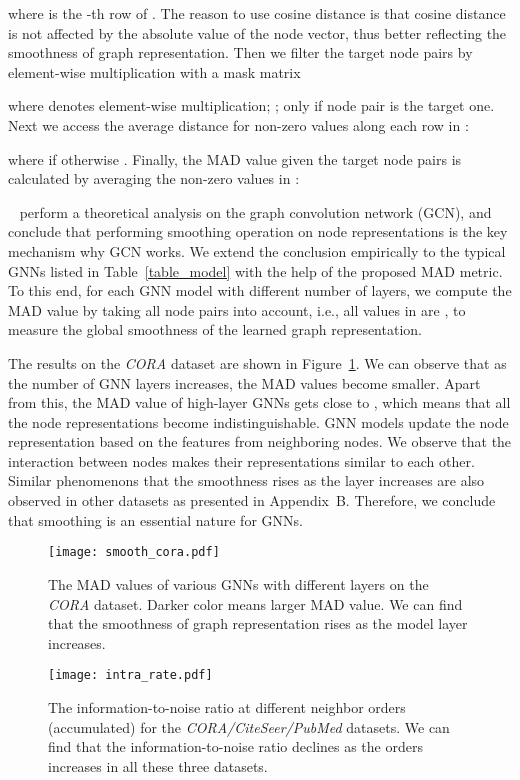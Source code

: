 \documentclass[letterpaper]{article} \usepackage{aaai20}  \usepackage{times}  \usepackage{helvet} \usepackage{courier}  \usepackage[hyphens]{url}  \usepackage{graphicx} \urlstyle{rm} \def\UrlFont{\rm}  \frenchspacing  \setlength{\pdfpagewidth}{8.5in}  \setlength{\pdfpageheight}{11in}  \setcounter{secnumdepth}{0}
\newcommand{\citet}[1]{\citeauthor{#1}~\shortcite{#1}}
\begin{document}
where  is the -th row of .
The reason to use cosine distance is that cosine distance is not affected by the absolute value of the node vector, thus better reflecting the smoothness of graph representation. 
Then we filter the target node pairs by element-wise multiplication  with a mask matrix 

where  denotes element-wise multiplication; ;  only if node pair  is the target one. Next we access the average distance  for non-zero values along each row in :

where  if  otherwise .
Finally, the MAD value given the target node pairs is calculated by averaging the non-zero values in :


\citet{analysis_smoothing} perform a theoretical analysis on the graph convolution network (GCN), and conclude that performing smoothing operation on node representations is the key mechanism why GCN works.
We extend the conclusion empirically to the  typical GNNs listed in Table~\ref{table_model} with the help of the proposed MAD metric.
To this end, for each GNN model with different number of layers, we compute the MAD value  by taking all node pairs into account, i.e., all values in  are , to measure the global smoothness of the learned graph representation.

The results on the \textit{CORA} dataset are shown in Figure~\ref{figure_smooth_pattern}. We can observe that as the number of GNN layers increases, the MAD values become smaller. 
Apart from this, the MAD value of high-layer GNNs gets close to , which means that all the node representations become indistinguishable. 
GNN models update the node representation based on the features from neighboring nodes. We observe that the interaction between nodes makes their representations similar to each other. 
Similar phenomenons that the smoothness rises as the layer increases are also observed in other datasets as presented in Appendix~B. Therefore, we conclude that smoothing is an essential nature for GNNs. 




\begin{figure}[t]
\centering
\texttt{[image: smooth\_cora.pdf]}
\caption{The MAD values of various GNNs with different layers on the \textit{CORA} dataset. Darker color means larger MAD value. We can find that the smoothness of graph representation rises as the model layer increases.}
\label{figure_smooth_pattern}
\end{figure}
\begin{figure}
\centering
\texttt{[image: intra\_rate.pdf]}
\caption{The information-to-noise ratio at different neighbor orders (accumulated) for the \textit{CORA/CiteSeer/PubMed} datasets. We can find that the information-to-noise ratio declines as the orders increases in all these three datasets.}
\label{figure_type_order}
\end{figure}
\end{document}
